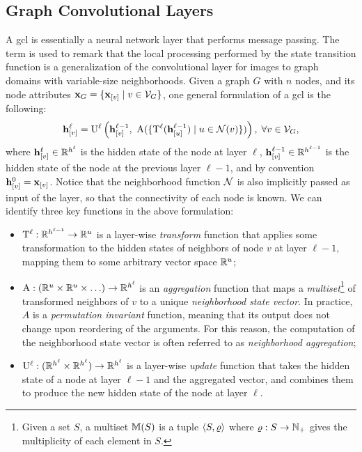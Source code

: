 \subsection{Graph Convolutional Layers}\label{sec:graph-conv-layers}
A \gls{gcl} is essentially a neural network layer that performs message passing. The term  is used to remark that the local processing performed by the state transition function is a generalization of the convolutional layer for images to graph domains with variable-size neighborhoods. Given a graph $G$ with $n$ nodes, and its node attributes $\Vector{X}_G = \Set{\Elem{x}{v} \mid v \in \Cal{V}_G}$, one general formulation of a \gls{gcl} is the following:
\begin{align}
    \label{eq:simple-aggregation}
    \Elem{h}{v}^{\ell} = \Fun{U}^{\ell} \Paren{\Elem{h}{v}^{\ell-1},\ \Fun{A}(\Set{\Fun{T}^{\ell}(\Elem{h}{u}^{\ell-1}) \mid u \in \mathcal{N}(v)} )}, \; \forall v \in \Cal{V}_G,
\end{align}
where $\Elem{h}{v}^{\ell} \in \Real^{h^\ell}$ is the hidden state of the node at layer $\ell$, $\Elem{h}{v}^{\ell-1} \in \Real^{h^{\ell-1}}$ is the hidden state of the node at the previous layer $\ell-1$, and by convention $\Elem{h}{v}^{0} = \Elem{x}{v}$. Notice that the neighborhood function $\Cal{N}$ is also implicitly passed as input of the layer, so that the connectivity of each node is known. We can identify three key functions in the above formulation:
\begin{itemize}
    \item $\mathrm{T}^\ell: \mathbb{R}^{h^{\ell-1}} \rightarrow \mathbb{R}^u$ is a layer-wise \emph{transform} function that applies some transformation to the hidden states of neighbors of node $v$ at layer $\ell-1$, mapping them to some arbitrary vector space $\mathbb{R}^u$;
    \item $\mathrm{A}: (\mathbb{R}^u \times \mathbb{R}^u \times \ldots) \rightarrow \mathbb{R}^{h^{\ell}}$ is an \emph{aggregation} function that maps a \emph{multiset}\footnote{Given a set $S$, a multiset $\mathbb{M}(S)$ is a tuple $\langle S, \varrho \rangle$ where $\varrho: S \rightarrow \mathbb{N}_+$ gives the multiplicity of each element in $S$.} of transformed neighbors of $v$ to a unique \emph{neighborhood state vector}. In practice, $A$ is a \emph{permutation invariant} function, meaning that its output does not change upon reordering of the arguments. For this reason, the computation of the neighborhood state vector is often referred to as \emph{neighborhood aggregation};
    \item $\mathrm{U}^\ell: (\mathbb{R}^{h^{\ell}} \times \mathbb{R}^{h^{\ell}}) \rightarrow \mathbb{R}^{h^{\ell}}$ is a layer-wise \emph{update} function that takes the hidden state of a node at layer $\ell-1$ and the aggregated vector, and combines them to produce the new hidden state of the node at layer $\ell$.
\end{itemize}
